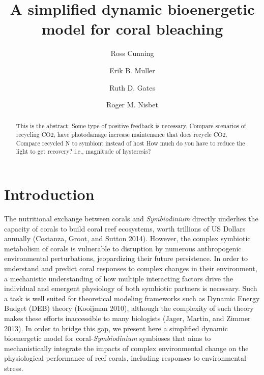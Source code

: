 \documentclass[]{elsarticle} %
\begin{document}
\begin{frontmatter}

  \title{A simplified dynamic bioenergetic model for coral bleaching}
    \author[University of Hawaii]{Ross Cunning}
    \author[University of California]{Erik B. Muller}
  
  
    \author[University of Hawaii]{Ruth D. Gates}
  
  
    \author[University of California]{Roger M. Nisbet}
  
  
      \address[University of Hawaii]{Hawaii Institute of Marine Biology, Kaneohe, HI 96744, USA}
    \address[University of California]{Department of Ecology, Evolution, and Marine Biology, Santa Barbara, CA
93106, USA}
  
  \begin{abstract}
  This is the abstract. Some type of positive feedback is necessary.
  Compare scenarios of recycling CO2, have photodamage increase
  maintenance that does recycle CO2. Compare recycled N to symbiont
  instead of host How much do you have to reduce the light to get
  recovery? i.e., magnitude of hysteresis?
  \end{abstract}
  
 \end{frontmatter}

\section{Introduction}\label{introduction}

The nutritional exchange between corals and \emph{Symbiodinium} directly
underlies the capacity of corals to build coral reef ecosystems, worth
trillions of US Dollars annually (Costanza, Groot, and Sutton 2014).
However, the complex symbiotic metabolism of corals is vulnerable to
disruption by numerous anthropogenic environmental perturbations,
jeopardizing their future persistence. In order to understand and
predict coral responses to complex changes in their environment, a
mechanistic understanding of how multiple interacting factors drive the
individual and emergent physiology of both symbiotic partners is
necessary. Such a task is well suited for theoretical modeling
frameworks such as Dynamic Energy Budget (DEB) theory (Kooijman 2010),
although the complexity of such theory makes these efforts inaccessible
to many biologists (Jager, Martin, and Zimmer 2013). In order to bridge
this gap, we present here a simplified dynamic bioenergetic model for
coral-\emph{Symbiodinium} symbioses that aims to mechanistically
integrate the impacts of complex environmental change on the
physiological performance of reef corals, including responses to
environmental stress.
\end{document}
